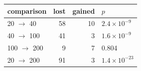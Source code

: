 \setlength{\tabcolsep}{4pt}
\begin{tabular}{lrrl}
\toprule
comparison & lost & gained & $p$ \\
\midrule
20 $\to$ 40 & 58 & 10 & $2.4\times10^{-9}$ \\
40 $\to$ 100 & 41 & 3 & $1.6\times10^{-9}$ \\
100 $\to$ 200 & 9 & 7 & 0.804 \\
20 $\to$ 200 & 91 & 3 & $1.4\times10^{-23}$ \\
\bottomrule
\end{tabular}
